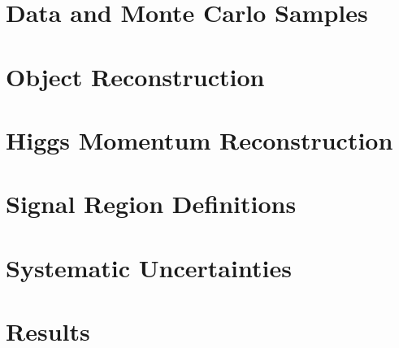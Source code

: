 \documentclass[NOTE, atlasdraft=true, texlive=2016, UKenglish]{\ATLASLATEXPATH atlasdoc}
\begin{document}

\section{Data and Monte Carlo Samples}
\label{sec:dataMC}



\section{Object Reconstruction}
\label{sec:objReco}




\section{Higgs Momentum Reconstruction}
\label{sec:mva}



\section{Signal Region Definitions}
\label{sec:signal_region}



\section{Systematic Uncertainties}
\label{sec:sys}


                                                                
\section{Results}
\label{sec:results}

\end{document}
